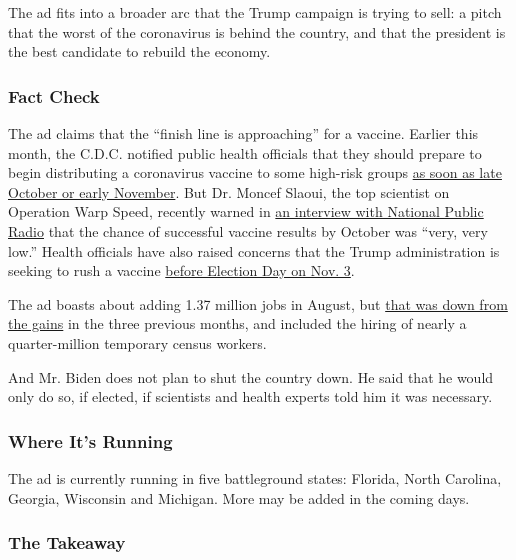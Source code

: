 The ad fits into a broader arc that the Trump campaign is trying to
sell: a pitch that the worst of the coronavirus is behind the country,
and that the president is the best candidate to rebuild the economy.

\hypertarget{fact-check}{%
\subsubsection{Fact Check}\label{fact-check}}

The ad claims that the ``finish line is approaching'' for a vaccine.
Earlier this month, the C.D.C. notified public health officials that
they should prepare to begin distributing a coronavirus vaccine to some
high-risk groups
\href{https://www.nytimes3xbfgragh.onion/2020/09/02/health/covid-19-vaccine-cdc-plans.html}{as
soon as late October or early November}. But Dr. Moncef Slaoui, the top
scientist on Operation Warp Speed, recently warned in
\href{https://www.npr.org/2020/09/03/909312697/operation-warp-speed-top-adviser-on-the-status-of-a-coronavirus-vaccine}{an
interview with National Public Radio} that the chance of successful
vaccine results by October was ``very, very low.'' Health officials have
also raised concerns that the Trump administration is seeking to rush a
vaccine
\href{https://www.nytimes3xbfgragh.onion/2020/09/02/health/covid-19-vaccine-cdc-plans.html}{before
Election Day on Nov. 3}.

The ad boasts about adding 1.37 million jobs in August, but
\href{https://www.nytimes3xbfgragh.onion/2020/09/04/business/economy/jobs-report.html?utm_source=ground.news\&utm_medium=referral}{that
was down from the gains} in the three previous months, and included the
hiring of nearly a quarter-million temporary census workers.

And Mr. Biden does not plan to shut the country down. He said that he
would only do so, if elected, if scientists and health experts told him
it was necessary.

\hypertarget{where-its-running}{%
\subsubsection{Where It's Running}\label{where-its-running}}

The ad is currently running in five battleground states: Florida, North
Carolina, Georgia, Wisconsin and Michigan. More may be added in the
coming days.

\hypertarget{the-takeaway}{%
\subsubsection{The Takeaway}\label{the-takeaway}}

